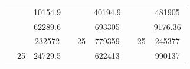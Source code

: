 \begin{table}[]
\begin{tabular}{|cccccclll}
\rowcolor[HTML]{DAE8FC} 
\multicolumn{1}{|c|}{\cellcolor[HTML]{FFFFC7}}                                & \multicolumn{1}{c|}{\cellcolor[HTML]{DAE8FC}}                      & \multicolumn{1}{c|}{\cellcolor[HTML]{DAE8FC}10154.9}   & \multicolumn{1}{c|}{\cellcolor[HTML]{FFFFC7}}                                & \multicolumn{1}{c|}{\cellcolor[HTML]{DAE8FC}}                       & \multicolumn{1}{c|}{\cellcolor[HTML]{DAE8FC}40194.9}   & \multicolumn{1}{c|}{\cellcolor[HTML]{FFFFC7}}                                & \multicolumn{1}{c|}{\cellcolor[HTML]{DAE8FC}}                      & \multicolumn{1}{c|}{\cellcolor[HTML]{DAE8FC}481905}    \\ \cline{3-3} \cline{6-6} \cline{9-9} 
\multicolumn{1}{|c|}{\cellcolor[HTML]{FFFFC7}}                                & \multicolumn{1}{c|}{\cellcolor[HTML]{DAE8FC}}                      & \multicolumn{1}{c|}{\cellcolor[HTML]{DDFDFF}62289.6}   & \multicolumn{1}{c|}{\cellcolor[HTML]{FFFFC7}}                                & \multicolumn{1}{c|}{\cellcolor[HTML]{DAE8FC}}                       & \multicolumn{1}{c|}{\cellcolor[HTML]{DDFDFF}693305}    & \multicolumn{1}{c|}{\cellcolor[HTML]{FFFFC7}}                                & \multicolumn{1}{c|}{\cellcolor[HTML]{DAE8FC}}                      & \multicolumn{1}{c|}{\cellcolor[HTML]{DDFDFF}9176.36}   \\ \cline{3-3} \cline{6-6} \cline{9-9} 
\rowcolor[HTML]{DAE8FC} 
\multicolumn{1}{|c|}{\cellcolor[HTML]{FFFFC7}}                                & \multicolumn{1}{c|}{\cellcolor[HTML]{DAE8FC}}                      & \multicolumn{1}{c|}{\cellcolor[HTML]{DAE8FC}232572}    & \multicolumn{1}{c|}{\cellcolor[HTML]{FFFFC7}}                                & \multicolumn{1}{c|}{\multirow{-9}{*}{\cellcolor[HTML]{DAE8FC}25}}   & \multicolumn{1}{c|}{\cellcolor[HTML]{DAE8FC}779359}    & \multicolumn{1}{c|}{\cellcolor[HTML]{FFFFC7}}                                & \multicolumn{1}{c|}{\multirow{-9}{*}{\cellcolor[HTML]{DAE8FC}25}}  & \multicolumn{1}{c|}{\cellcolor[HTML]{DAE8FC}245377}    \\ \cline{3-3} \cline{5-6} \cline{8-9} 
\multicolumn{1}{|c|}{\cellcolor[HTML]{FFFFC7}}                                & \multicolumn{1}{c|}{\multirow{-10}{*}{\cellcolor[HTML]{DAE8FC}25}} & \multicolumn{1}{c|}{\cellcolor[HTML]{DDFDFF}24729.5}   & \multicolumn{1}{c|}{\cellcolor[HTML]{FFFFC7}}                                & \multicolumn{1}{c|}{\cellcolor[HTML]{DDFDFF}}                       & \multicolumn{1}{c|}{\cellcolor[HTML]{DAE8FC}622413}    & \multicolumn{1}{c|}{\cellcolor[HTML]{FFFFC7}}                                & \multicolumn{1}{c|}{\cellcolor[HTML]{DDFDFF}}                      & \multicolumn{1}{c|}{\cellcolor[HTML]{DAE8FC}990137}    \\ \cline{2-3} \cline{6-6} \cline{9-9} 

\end{tabular}
\end{table}
